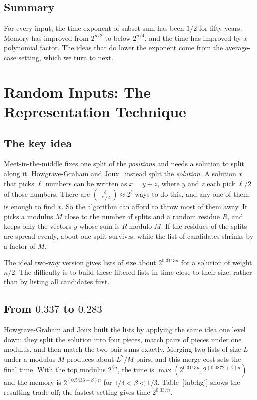 \documentclass[11pt]{article}
\begin{document}
\subsection{Summary}
For every input, the time exponent of subset sum has been $1/2$ for fifty years.
Memory has improved from $2^{n/2}$ to below $2^{n/4}$, and the time has improved
by a polynomial factor. The ideas that do lower the exponent come from
the average-case setting, which we turn to next.

\section{Random Inputs: The Representation Technique}\label{sec:repr}

\subsection{The key idea}
Meet-in-the-middle fixes one split of the \emph{positions} and needs a solution
to split along it. Howgrave-Graham and Joux~\cite{hgj} instead split the
\emph{solution}. A solution $x$ that picks $\ell$ numbers can be written as
$x=y+z$, where $y$ and $z$ each pick $\ell/2$ of those numbers. There are
$\binom{\ell}{\ell/2}\approx2^\ell$ ways to do this, and any one of them is enough
to find $x$. So the algorithm can afford to throw most of them away. It picks a
modulus $M$ close to the number of splits and a random residue $R$, and keeps
only the vectors $y$ whose sum is $R$ modulo $M$. If the residues of the splits
are spread evenly, about one split survives, while the list of candidates
shrinks by a factor of $M$.

The ideal two-way version gives lists of size about $2^{0.3113n}$ for a
solution of weight $n/2$. The difficulty is to build these filtered lists in
time close to their size, rather than by listing all candidates first.

\subsection{From $0.337$ to $0.283$}
Howgrave-Graham and Joux built the lists by applying the same idea one level
down: they split the solution into four pieces, match pairs of pieces under one
modulus, and then match the two pair sums exactly. Merging two lists of size
$L$ under a modulus $M$ produces about $L^2/M$ pairs, and this merge cost sets
the final time. With the top modulus $2^{\beta n}$, the time is
$\max(2^{0.3113n},2^{(0.0872+\beta)n})$ and the memory is $2^{(0.5436-\beta)n}$
for $1/4<\beta<1/3$. Table~\ref{tab:hgj} shows the resulting trade-off; the
fastest setting gives time $2^{0.337n}$.
\end{document}
